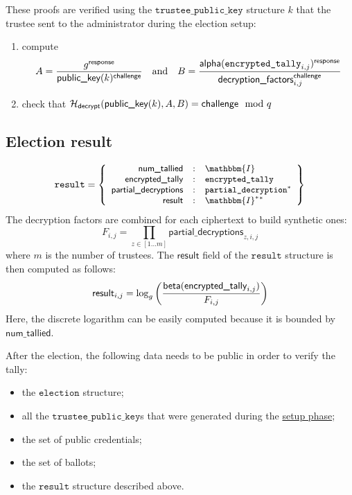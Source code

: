 \documentclass[a4paper]{article}
\newcommand{\I}{\mathbbm{I}}
\newcommand{\tpk}{\texttt{trustee\_public\_key}}
\newcommand{\election}{\texttt{election}}
\newcommand{\etally}{\texttt{encrypted\_tally}}
\newcommand{\pdecryption}{\texttt{partial\_decryption}}
\newcommand{\result}{\texttt{result}}
\begin{document}
These proofs are verified using the $\tpk$ structure $k$ that the
trustee sent to the administrator during the election setup:
\begin{enumerate}
\item compute
\[
A=\frac{g^\response}{\pklabel(k)^\challenge}
\quad\text{and}\quad
B=\frac{\alphalabel(\etally_{i,j})^\response}{\dfactors_{i,j}^\challenge}
\]
\item check that $\mathcal{H}_{\textsf{decrypt}}(\textsf{public\_key}(k),A,B)=\textsf{challenge}\mod q$
\end{enumerate}

\subsection{Election result}
\label{election-result}

\newcommand{\ntallied}{\textsf{num\_tallied}}
\newcommand{\etallylabel}{\textsf{encrypted\_tally}}
\newcommand{\pdlabel}{\textsf{partial\_decryptions}}
\newcommand{\resultlabel}{\textsf{result}}

\begin{gather*}
  \result=\left\{\small
    \begin{array}{rcl}
      \ntallied&:&\I\\
      \etallylabel&:&\etally\\
      \pdlabel&:&\pdecryption^\ast\\
      \resultlabel&:&\I^\ast{}^\ast
    \end{array}
  \right\}
\end{gather*}
The decryption factors are combined for each ciphertext to build
synthetic ones:
\[
F_{i,j}=\prod_{z\in[1\dots m]}\pdlabel_{z,i,j}
\]
where $m$ is the number of trustees. The $\resultlabel$ field of the
$\result$ structure is then computed as follows:
\[
\resultlabel_{i,j}=\log_g\left(\frac{\betalabel(\etallylabel_{i,j})}{F_{i,j}}\right)
\]
Here, the discrete logarithm can be easily computed because it is
bounded by $\ntallied$.

After the election, the following data needs to be public in order to
verify the tally:
\begin{itemize}
\item the $\election$ structure;
\item all the $\tpk$s that were generated during the
  \hyperref[election-setup]{setup phase};
\item the set of public credentials;
\item the set of ballots;
\item the $\result$ structure described above.
\end{itemize}
\end{document}
